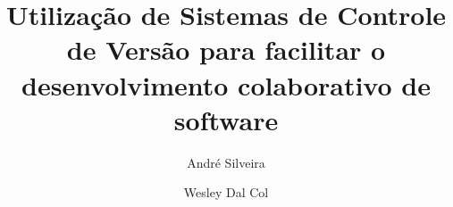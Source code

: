 \documentclass[times, capchap, capsec, floatnumber=continuous, header=yes]{abnt}
\author{André Silveira \and Wesley Dal Col}
\title{Utilização de Sistemas de Controle de Versão para facilitar o desenvolvimento colaborativo de software}
\begin{document}
\maketitle



\sumario








\end{document}
